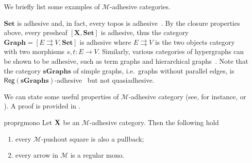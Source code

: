 \documentclass[3p]{elsarticle}
\newcommand{\cat}[1]{\ensuremath{\mathbf{#1}}}
\def\C{\textbf {\textup{C}}}
\def\X{\textbf {\textup{X}}}
\newcommand{\reg}{\mathsf{Reg}}
\theoremstyle{remark}
\theoremstyle{definition}
\begin{document}
We briefly list some examples of $\mathcal{M}$-adhesive categories.

\begin{exa}
	\label{ex:adhesive}
	$\cat{Set}$ is adhesive and, in fact, every topos is
	adhesive~\cite{lack2006toposes}. By the closure properties above, every presheaf $[\cat{X},\cat{Set}]$ is adhesive, thus the category
	$\cat{Graph} = [ E \rightrightarrows V, \cat{Set}]$ is adhesive
	where $E \rightrightarrows {V}$ is the two objects category with two
	morphisms $s,t \colon{E} \to {V}$. Similarly, various
	categories of hypergraphs can be shown to be adhesive, such as term
	graphs and hierarchical graphs~\cite{CastelnovoGM24}. Note that the category $\cat{sGraphs}$ of simple graphs, 
	i.e.~graphs without parallel edges, is
	$\reg{(\cat{sGraphs})}$-adhesive~\cite{BehrHK23} but not
	quasiadhesive.
\end{exa}

\iffalse 
\begin{rem}\label{rem:deco}
We can point out an important property of strict $\mathcal{M}$-adhesive categories with pullbacks.  Consider the solid part of the cube aside, whose bottom case is an $\mathcal{M}$-pushout.
	
	\parbox{9.5cm}{	Given an arrow $d\colon X\to D$, we can present the object $X$ has a pushout: indeed, consider the following cube, in which all the three vertical squares are pullbacks.}
	\parbox{3cm}{
	\xymatrix@C=15pt@R=9pt{&V\ar[dd]|\hole_(.65){a}\ar[rr]^{v} \ar@{>.>}[dl]_{u} && Y \ar[dd]^{b} \ar@{>->}[dl]_{y} \\ Z  \ar[dd]_{c}\ar[rr]^(.7){z} & & X \ar[dd]_(.3){d}\\&A\ar[rr]|\hole^(.65){f} \ar@{>->}[dl]^{m} && B \ar@{>->}[dl]^{n} \\C \ar[rr]_{g} & & D }}

Now, notice that, since the front square is a pullback, then the dotted arrow $u\colon V\to Z$ exists. Moreover, the usual composition and decomposition property of pullbacks \cite{mac2013categories} entails that the left face of the cube so obtained is a pullback too, proving that $u$ is in $\mathcal{M}$ and that the top square is a pushout.

	Clearly if the arrow $p\colon X\to D$ is in $\mathcal{M}$, we can omit the assumptions of strictness and the existence of all pullbacks.
\end{rem}
\fi 


We can state some useful properties of $\mathcal{M}$-adhesive category
(see, for instance, \cite[Thm.~4.26]{ehrig2006fundamentals} or \cite[Fact 2.6]{azzi2019essence}). A proof is provided in .
\begin{restatable}{prop}{rgmono}\label{prop:regmono}
	Let $\X$ be an $\mathcal{M}$-adhesive category. Then the following hold
	\begin{enumerate}
		\item every $\mathcal{M}$-pushout square is also a pullback;
		\item every arrow in $\mathcal{M}$ is a regular mono.
	\end{enumerate}
\end{restatable}
\end{document}
